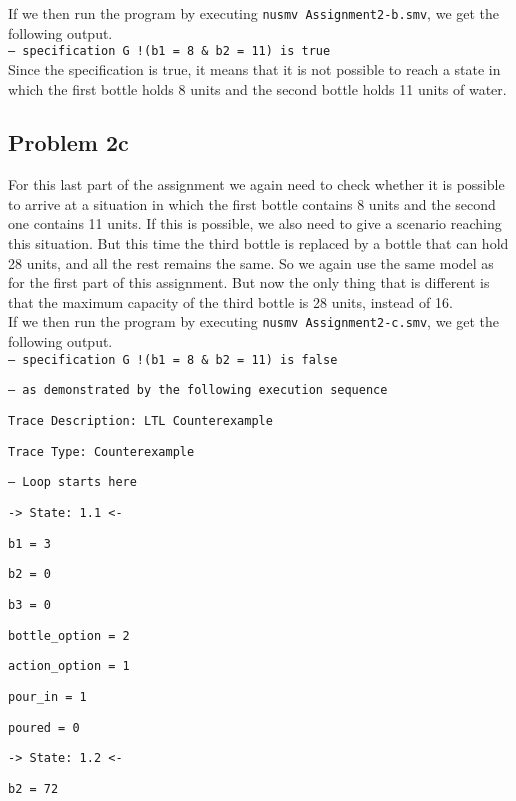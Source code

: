 \documentclass[a4paper]{article}
\begin{document}
	If we then run the program by executing {\tt nusmv Assignment2-b.smv}, we get the following output.\\
	
{\tt -- specification  G !(b1 = 8 \& b2 = 11)  is true}\\

Since the specification is true, it means that it is not possible to reach a state in which the first bottle holds 8 units and the second bottle holds 11 units of water.

	\subsection*{Problem 2c}
	For this last part of the assignment we again need to check whether it is possible to arrive at a situation in which the first bottle contains 8 units and the second one contains 11 units. If this is possible, we also need to give a scenario reaching this situation. But this time the third bottle is replaced by a bottle that can hold 28 units, and all the rest remains the same. So we again use the same model as for the first part of this assignment. But now the only thing that is different is that the maximum capacity of the third bottle is 28 units, instead of 16.\\
	
	If we then run the program by executing {\tt nusmv Assignment2-c.smv}, we get the following output.\\

{\tt -- specification  G !(b1 = 8 \& b2 = 11)  is false }

{\tt -- as demonstrated by the following execution sequence }

{\tt Trace Description: LTL Counterexample }

{\tt Trace Type: Counterexample }

{\tt   -- Loop starts here }

{\tt   -> State: 1.1 <- }

{\tt     b1 = 3 }

{\tt     b2 = 0 }

{\tt     b3 = 0 }

{\tt     bottle\_option = 2 }

{\tt     action\_option = 1 }

{\tt     pour\_in = 1 }

{\tt     poured = 0 }

{\tt   -> State: 1.2 <- }

{\tt     b2 = 72 }
\end{document}
